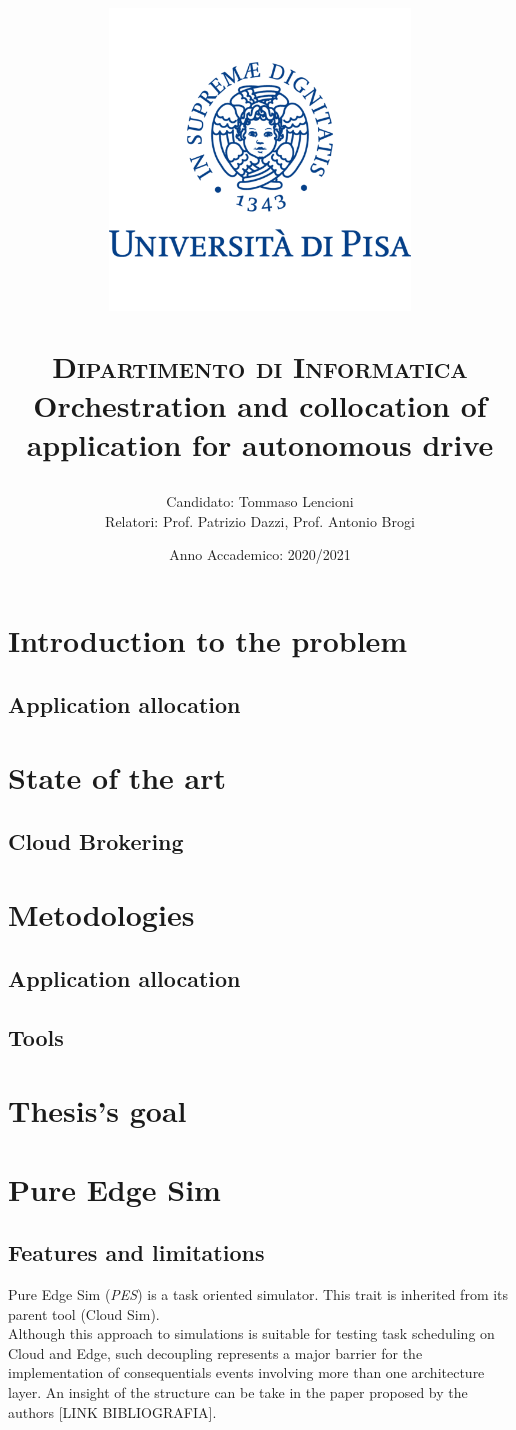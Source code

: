 \documentclass[12pt]{report}
\title{\centerline{\includegraphics[width=8cm,height=8cm]{logo.png}}
{\scshape Dipartimento di Informatica}\\
\vspace{0.5cm}
Orchestration and collocation of application for autonomous drive}
\author{Candidato: Tommaso Lencioni\\
Relatori: Prof. Patrizio Dazzi, Prof. Antonio Brogi}
\date{Anno Accademico: 2020/2021}
\begin{document}
\maketitle


\tableofcontents{}

\chapter{Introduction to the problem}
\section{Application allocation}

\chapter{State of the art}
\section{Cloud Brokering}


\chapter{Metodologies}
\section{Application allocation}
\section{Tools}

\chapter{Thesis's goal}

\chapter{Pure Edge Sim}
\section{Features and limitations}
Pure Edge Sim (\textit{PES}) is a task oriented simulator. This trait is inherited from its parent tool (Cloud Sim).\\ Although this approach to simulations is suitable for testing task scheduling on Cloud and Edge, such decoupling represents a major barrier for the implementation of consequentials events involving more than one architecture layer.
An insight of the structure can be take in the paper proposed by the authors [LINK BIBLIOGRAFIA].
\end{document}
